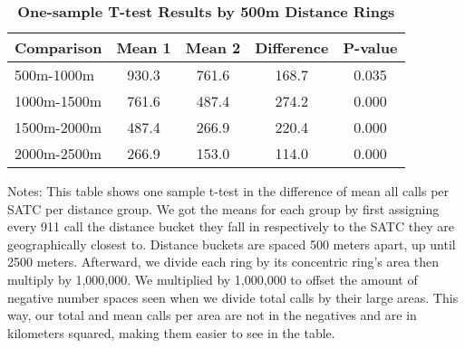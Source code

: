 \begin{table}[htbp]
\centering
\begin{tabular}{l|c c c c}
\hline
Comparison & Mean 1 & Mean 2 & Difference & P-value \\
\hline
500m-1000m & 930.3 & 761.6 & 168.7 & 0.035 \\
1000m-1500m & 761.6 & 487.4 & 274.2 & 0.000 \\
1500m-2000m & 487.4 & 266.9 & 220.4 & 0.000 \\
2000m-2500m & 266.9 & 153.0 & 114.0 & 0.000 \\
\hline
\end{tabular}
\caption{\textbf{One-sample T-test Results by 500m Distance Rings}}
\label{tab:ttests2}
\centering\small{Notes: This table shows one sample t-test in the difference of mean all calls per SATC per distance group. We got the means for each group by first assigning every 911 call the distance bucket they fall in respectively to the SATC they are geographically closest to. Distance buckets are spaced 500 meters apart, up until 2500 meters. Afterward, we divide each ring by its concentric ring's area then multiply by 1,000,000. We multiplied by 1,000,000 to offset the amount of negative number spaces seen when we divide total calls by their large areas. This way, our total and mean calls per area are not in the negatives and are in kilometers squared, making them easier to see in the table.}
\end{table}
